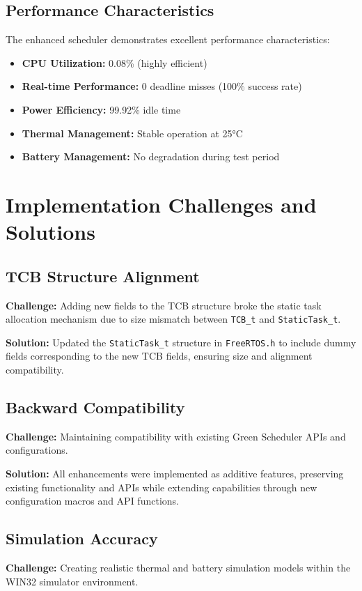 \documentclass[11pt,a4paper]{article}
\begin{document}
\subsection{Performance Characteristics}
The enhanced scheduler demonstrates excellent performance characteristics:

\begin{itemize}
    \item \textbf{CPU Utilization:} 0.08\% (highly efficient)
    \item \textbf{Real-time Performance:} 0 deadline misses (100\% success rate)
    \item \textbf{Power Efficiency:} 99.92\% idle time
    \item \textbf{Thermal Management:} Stable operation at 25°C
    \item \textbf{Battery Management:} No degradation during test period
\end{itemize}

\section{Implementation Challenges and Solutions}

\subsection{TCB Structure Alignment}
\textbf{Challenge:} Adding new fields to the TCB structure broke the static task allocation mechanism due to size mismatch between \texttt{TCB\_t} and \texttt{StaticTask\_t}.

\textbf{Solution:} Updated the \texttt{StaticTask\_t} structure in \texttt{FreeRTOS.h} to include dummy fields corresponding to the new TCB fields, ensuring size and alignment compatibility.

\subsection{Backward Compatibility}
\textbf{Challenge:} Maintaining compatibility with existing Green Scheduler APIs and configurations.

\textbf{Solution:} All enhancements were implemented as additive features, preserving existing functionality and APIs while extending capabilities through new configuration macros and API functions.

\subsection{Simulation Accuracy}
\textbf{Challenge:} Creating realistic thermal and battery simulation models within the WIN32 simulator environment.
\end{document}
